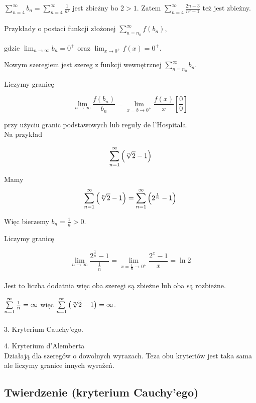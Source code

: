 $ \sum\limits_{n = 4}^{\infty} b_n = \sum\limits_{n = 4}^{\infty} \frac{1}{n^2} $ jest zbieżny bo $ 2 > 1 $.
Zatem $ \sum\limits_{n = 4}^{\infty} \frac{2n - 3}{n^3 - 1} $ też jest zbieżny. \\\\

Przykłady o postaci funkcji złożonej $ \sum\limits_{n = n_0}^{\infty} f(b_n) $,

gdzie $ \lim_{n \to \infty} b_n = 0^+ $ oraz $ \lim_{x \to 0^+} f(x) = 0^+ $.

Nowym szeregiem jest szereg z funkcji wewnętrznej $ \sum\limits_{n = n_0}^{\infty} b_n $.

Liczymy granicę 

$$ \lim_{n \to \infty} \frac{f(b_n)}{b_n} = \lim_{x=b \to 0^+} \frac{f(x)}{x} \left[ \frac{0}{0} \right] $$

przy użyciu granic podstawowych lub reguły de l'Hospitala. \\

Na przykład

$$ \sum\limits_{n = 1}^{\infty} \left( \sqrt[n]{2} - 1 \right) $$

Mamy $$ \sum\limits_{n = 1}^{\infty} \left( \sqrt[n]{2} - 1 \right) = \sum\limits_{n = 1}^{\infty} \left( 2^{\frac{1}{n}} - 1 \right) $$

Więc bierzemy $ b_n = \frac{1}{n} > 0 $.

Liczymy granicę

$$ \lim_{n \to \infty} \frac{2^{\frac{1}{n}} - 1}{\frac{1}{n}} = \lim_{x = \frac{1}{n} \to 0^+} \frac{2^x - 1}{x} = \ln 2 $$ \\

Jest to liczba dodatnia więc oba szeregi są zbieżne lub oba są rozbieżne.

$ \sum\limits_{n = 1}^{\infty} \frac{1}{n} = \infty $ więc $ \sum\limits_{n = 1}^{\infty} \left( \sqrt[n]{2} - 1 \right) = \infty $. \\ \\

3. Kryterium Cauchy'ego.

4. Kryterium d'Alemberta \\

Działają dla szeregów o dowolnych wyrazach. Teza obu kryteriów jest taka sama ale liczymy granice innych wyrażeń.


\subsection*{Twierdzenie (kryterium Cauchy'ego)}

